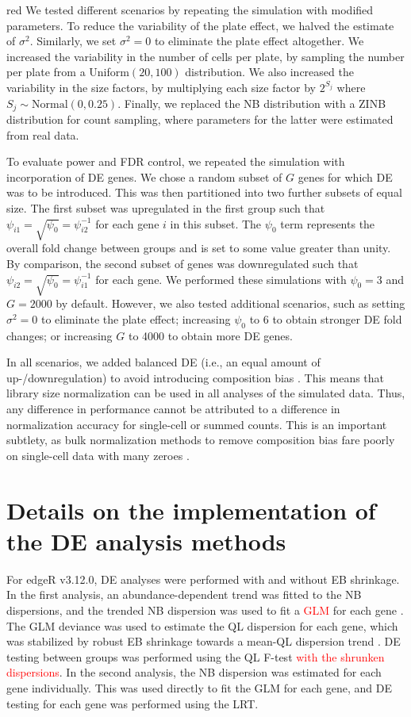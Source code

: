\documentclass{article}
\newcommand\revised[1]{\textcolor{red}{#1}}
\begin{document}
\begin{color}{red}
We tested different scenarios by repeating the simulation with modified parameters.
To reduce the variability of the plate effect, we halved the estimate of $\sigma^2$. 
Similarly, we set $\sigma^2=0$ to eliminate the plate effect altogether.
We increased the variability in the number of cells per plate, by sampling the number per plate from a Uniform$(20, 100)$ distribution.
We also increased the variability in the size factors, by multiplying each size factor by $2^{S_j}$ where $S_j \sim \mbox{Normal}(0, 0.25)$.
Finally, we replaced the NB distribution with a ZINB distribution for count sampling, where parameters for the latter were estimated from real data.

To evaluate power and FDR control, we repeated the simulation with incorporation of DE genes.
We chose a random subset of $G$ genes for which DE was to be introduced.
This was then partitioned into two further subsets of equal size.
The first subset was upregulated in the first group such that $\psi_{i1} = \sqrt{\psi_0} = \psi_{i2}^{-1}$ for each gene $i$ in this subset.
The $\psi_0$ term represents the overall fold change between groups and is set to some value greater than unity.
By comparison, the second subset of genes was downregulated such that $\psi_{i2} = \sqrt{\psi_0} = \psi_{i1}^{-1}$ for each gene.
We performed these simulations with $\psi_0 =3$ and $G=2000$ by default.
However, we also tested additional scenarios, such as setting $\sigma^2=0$ to eliminate the plate effect; increasing $\psi_0$ to 6 to obtain stronger DE fold changes; or increasing $G$ to 4000 to obtain more DE genes.

In all scenarios, we added balanced DE (i.e., an equal amount of up-/downregulation) to avoid introducing composition bias \citep{robinson2010scaling}.
This means that library size normalization can be used in all analyses of the simulated data.
Thus, any difference in performance cannot be attributed to a difference in normalization accuracy for single-cell or summed counts.
This is an important subtlety, as bulk normalization methods to remove composition bias fare poorly on single-cell data with many zeroes \citep{lun2016pooling}.
\end{color}

\section{Details on the implementation of the DE analysis methods}
For edgeR v3.12.0, DE analyses were performed with and without EB shrinkage.
In the first analysis, an abundance-dependent trend was fitted to the NB dispersions, and the trended NB dispersion was used to fit a \revised{GLM} for each gene \citep{mccarthy2012differential}.
The GLM deviance was used to estimate the QL dispersion for each gene, which was stabilized by robust EB shrinkage towards a mean-QL dispersion trend \citep{lund2012detecting}.
DE testing between groups was performed using the QL F-test \revised{with the shrunken dispersions}.
In the second analysis, the NB dispersion was estimated for each gene individually.
This was used directly to fit the GLM for each gene, and DE testing for each gene was performed using the LRT.
\end{document}
